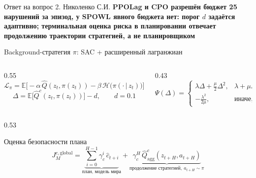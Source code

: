\begin{frame}[noframenumbering,shrink=8]{Ответ на вопрос 2. Николенко С.И.}
    \small
    \textbf{PPOLag и CPO разрешён бюджет 25 нарушений за эпизод, у SPOWL явного бюджета нет: порог $d$ задаётся адаптивно; терминальная оценка риска в планировании отвечает продолжению траектории стратегией, а не планировщиком}

    \vspace{0.3em}
    \begin{block}{Background-стратегия $\pi$: SAC + расширенный лагранжиан}
        \vspace{-0.5em}
        \begin{columns}[T,onlytextwidth]
            \begin{column}{0.55\textwidth}
                \[
                    \mathcal{L}_\pi =
                    \mathbb{E}\Big[-\alpha\,\hat{Q}(z_t, \pi(z_t))
                    - \beta\,\mathcal{H}\big(\pi(\cdot\,|\,z_t)\big)\Big]
                    + \Psi(\Delta),
                \]
                \[
                    \Delta = \mathbb{E}\big[\hat{Q}^c(z_t, \pi(z_t))\big] - d,
                    \qquad d = 0.1
                \]
            \end{column}
            \begin{column}{0.43\textwidth}
                \[
                    \Psi(\Delta) =
                    \begin{cases}
                        \lambda\Delta + \frac{\mu}{2}\Delta^2, & \lambda + \mu\Delta \ge 0,\\[0.2em]
                        -\frac{\lambda^2}{2\mu}, & \text{иначе},
                    \end{cases}
                \]
            \end{column}
        \end{columns}
    \end{block}
    \begin{columns}[T,onlytextwidth]
        \begin{column}{0.53\textwidth}
            \begin{block}{Оценка безопасности плана}
                \vspace{-0.6em}
                \[
                    J^{c,\mathrm{global}}_M
                    = \underbrace{\sum_{i=0}^{H-1}\gamma_c^i\,\hat{c}_{t+i}}_{\text{план, модель мира}}
                    + \underbrace{\gamma_c^H\,\hat{Q}^c_{\mathrm{agg}}(z_{t+H}, a_{t+H})}_{\text{продолжение стратегией},\ a_{t+H}\sim\pi}
                \]

\end{block}
\end{column}
\end{columns}
\end{frame}
